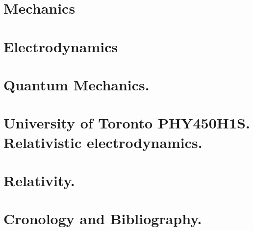 \documentclass[12pt,leqno]{book}
\begin{document}
\part{Mechanics}












\part{Electrodynamics}


\part{Quantum Mechanics.}








\part{University of Toronto PHY450H1S.  Relativistic electrodynamics.}


\part{Relativity.}











\part{Cronology and Bibliography.}





\end{document}
